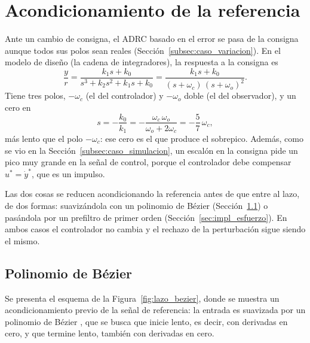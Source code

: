 \section{Acondicionamiento de la referencia}
\label{sec:impl_referencia}

Ante un cambio de consigna, el ADRC basado en el error se pasa de la consigna aunque todos sus
polos sean reales (Sección~\ref{subsec:caso_variacion}). En el modelo de diseño (la cadena de
integradores), la respuesta a la consigna es
\begin{equation}
\frac{y}{r} = \frac{k_1 s + k_0}{s^3 + k_2 s^2 + k_1 s + k_0}
= \frac{k_1 s + k_0}{(s + \omega_c)\,(s + \omega_o)^2} .
\label{eq:pref_yr}
\end{equation}
Tiene tres polos, $-\omega_c$ (el del controlador) y $-\omega_o$ doble (el del observador), y un
cero en
\begin{equation}
s = -\frac{k_0}{k_1} = -\frac{\omega_c\,\omega_o}{\omega_o + 2\omega_c} = -\frac{5}{7}\,\omega_c ,
\end{equation}
más lento que el polo $-\omega_c$: ese cero es el que produce el sobrepico. Además, como se vio en
la Sección~\ref{subsec:caso_simulacion}, un escalón en la consigna pide un pico muy grande en la
señal de control, porque el controlador debe compensar $u^* = \dot{y}^*$, que es un impulso.

Las dos cosas se reducen acondicionando la referencia antes de que entre al lazo, de dos formas:
suavizándola con un polinomio de Bézier (Sección~\ref{subsec:impl_bezier}) o pasándola por un
prefiltro de primer orden (Sección~\ref{sec:impl_esfuerzo}). En ambos casos el controlador no cambia
y el rechazo de la perturbación sigue siendo el mismo.

\subsection{Polinomio de Bézier}
\label{subsec:impl_bezier}
Se presenta el esquema de la Figura~\ref{fig:lazo_bezier}, donde se muestra un
acondicionamiento previo de la señal de referencia: la entrada es suavizada por un
polinomio de Bézier \cite{sira2017adrc,abadi2024robust}, que se busca que inicie lento, es decir, con derivadas en cero,
y que termine lento, también con derivadas en cero.

